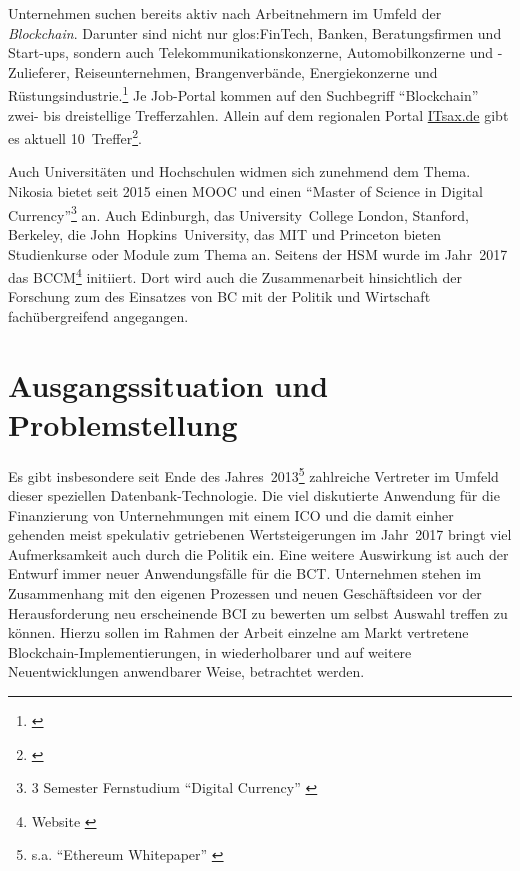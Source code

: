 Unternehmen suchen bereits aktiv nach Arbeitnehmern im Umfeld der \emph{Blockchain}.
Darunter sind nicht nur \gls{glos:FinTech}, Banken, Beratungsfirmen und Start-ups, sondern auch Telekommunikationskonzerne, Automobilkonzerne und -Zulieferer, Reiseunternehmen, Brangenverbände, Energiekonzerne und Rüstungsindustrie.\footnote{\cite{w:jobsearch-bc-stepstone}}
Je Job-Portal kommen auf den Suchbegriff \enquote{Blockchain} zwei- bis dreistellige Trefferzahlen.
Allein auf dem regionalen Portal \href{https://www.itsax.de/}{ITsax.de} gibt es aktuell 10~Treffer\footnote{\cite{w:jobsearch-bc-itsax}}.

Auch Universitäten und Hochschulen widmen sich zunehmend dem Thema. Nikosia bietet \ua{} seit 2015 einen \gls{MOOC} und einen \enquote{Master of Science in Digital Currency}\footnote{3 Semester Fernstudium \enquote{Digital Currency} \autocite{w:unic-master-dc}} an. Auch Edinburgh, das \mbox{University College} London, Stanford, Berkeley, die \mbox{John Hopkins University}, das \gls{MIT} und Princeton bieten Studienkurse oder Module zum Thema an. 
Seitens der \gls{HSM} wurde im Jahr~2017 das \gls{BCCM}\footnote{Website \autocite{w:bccm}} initiiert. Dort wird auch die Zusammenarbeit hinsichtlich der Forschung zum des Einsatzes von \gls{BC} mit der Politik und Wirtschaft fachübergreifend angegangen.

\newpage
\section{Ausgangssituation und Problemstellung}\label{sec:problemstellung}

Es gibt insbesondere seit Ende des Jahres~2013\footnote{s.a. \enquote{Ethereum Whitepaper} \autocite{p:ethereum}} zahlreiche Vertreter im Umfeld dieser speziellen Datenbank-Technologie.
Die viel diskutierte Anwendung für die Finanzierung von Unternehmungen mit einem \gls{ICO} und die damit einher gehenden meist spekulativ getriebenen Wertsteigerungen im Jahr~2017 bringt viel Aufmerksamkeit auch durch die Politik ein.
Eine weitere Auswirkung ist auch der Entwurf immer neuer Anwendungsfälle für die \gls{BCT}.
Unternehmen stehen im Zusammenhang mit den eigenen Prozessen und neuen Geschäftsideen vor der Herausforderung neu erscheinende \gls{BCI} zu bewerten um selbst Auswahl treffen zu können.
Hierzu sollen im Rahmen der Arbeit einzelne am Markt vertretene Blockchain-Implementierungen, in wiederholbarer und auf weitere Neuentwicklungen anwendbarer Weise, betrachtet werden.

